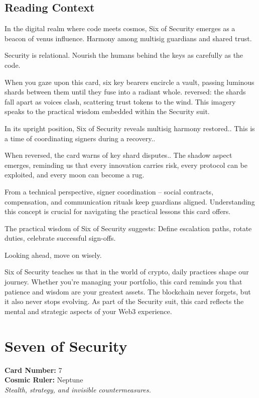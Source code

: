 \documentclass[11pt,oneside]{book}
\begin{document}
\begin{minipage}[t]{0.55\textwidth}
  \subsection*{Reading Context}
  In the digital realm where code meets cosmos, Six of Security emerges as a beacon of venus influence. Harmony among multisig guardians and shared trust.

  Security is relational. Nourish the humans behind the keys as carefully as the code.

  When you gaze upon this card, six key bearers encircle a vault, passing luminous shards between them until they fuse into a radiant whole. reversed: the shards fall apart as voices clash, scattering trust tokens to the wind. This imagery speaks to the practical wisdom embedded within the Security suit.

  In its upright position, Six of Security reveals multisig harmony restored.. This is a time of coordinating signers during a recovery..

  When reversed, the card warns of key shard disputes.. The shadow aspect emerges, reminding us that every innovation carries risk, every protocol can be exploited, and every moon can become a rug.

  From a technical perspective, signer coordination – social contracts, compensation, and communication rituals keep guardians aligned. Understanding this concept is crucial for navigating the practical lessons this card offers.

  The practical wisdom of Six of Security suggests: Define escalation paths, rotate duties, celebrate successful sign-offs.

  Looking ahead, move on wisely.

  Six of Security teaches us that in the world of crypto, daily practices shape our journey. Whether you're managing your portfolio, this card reminds you that patience and wisdom are your greatest assets. The blockchain never forgets, but it also never stops evolving. As part of the Security suit, this card reflects the mental and strategic aspects of your Web3 experience.

\end{minipage}

\newpage
\section*{Seven of Security}

\begin{minipage}[t]{0.55\textwidth}
  \vspace{0pt}
  \textbf{Card Number:} 7\\  \textbf{Cosmic Ruler:} Neptune\\  \textit{Stealth, strategy, and invisible countermeasures.}
\end{minipage}
\end{document}
